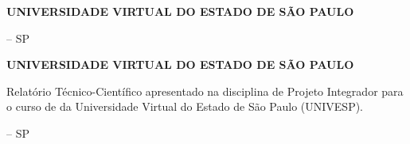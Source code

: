 \begin{titlepage}
    \centering

    {\large\bfseries UNIVERSIDADE VIRTUAL DO ESTADO DE SÃO PAULO}

    \vspace{3cm}

    {\large \docautores}

    \vfill

    {\large\bfseries \doctitulo}

    \vfill

    {\large \doccidade{} -- SP}\\
    {\large \docano}
\end{titlepage}

\begin{titlepage}
    \centering

    {\large\bfseries UNIVERSIDADE VIRTUAL DO ESTADO DE SÃO PAULO}

    \vspace{5cm}

    {\large\bfseries \doctitulo}

    \vspace{2cm}

    \hfill
    \begin{minipage}{0.5\textwidth}
        \singlespacing
        Relatório Técnico-Científico apresentado na disciplina de Projeto
        Integrador para o curso de \doccurso{} da Universidade
        Virtual do Estado de São Paulo (UNIVESP).
    \end{minipage}

    \vfill

    {\large \doccidade{} -- SP}\\
    {\large \docano}
\end{titlepage}
